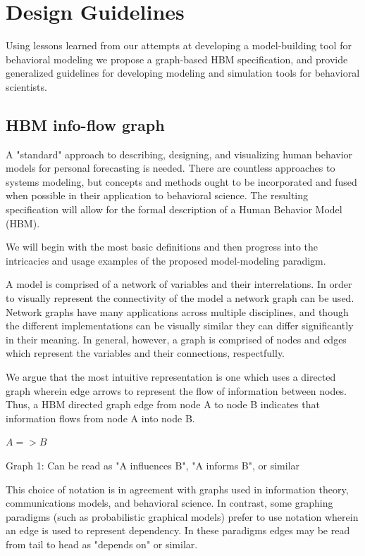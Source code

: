 \documentclass[conference]{IEEEtran}
\begin{document}
\section{Design Guidelines}
Using lessons learned from our attempts at developing a model-building tool for behavioral modeling we propose a graph-based HBM specification, and provide generalized guidelines for developing modeling and simulation tools for behavioral scientists.

\subsection{HBM info-flow graph}
A "standard" approach to describing, designing, and visualizing human behavior models for personal forecasting is needed.
There are countless approaches to systems modeling, but concepts and methods ought to be incorporated and fused when possible in their application to behavioral science.
The resulting specification will allow for the formal description of a Human Behavior Model (HBM).

We will begin with the most basic definitions and then progress into the intricacies and usage examples of the proposed model-modeling paradigm.

A model is comprised of a network of variables and their interrelations.
In order to visually represent the connectivity of the model a network graph can be used.
Network graphs have many applications across multiple disciplines, and though the different implementations can be visually similar they can differ significantly in their meaning.
In general, however, a graph is comprised of nodes and edges which represent the variables and their connections, respectfully. 

We argue that the most intuitive representation is one which uses a directed graph wherein edge arrows to represent the flow of information between nodes.
Thus, a HBM  directed graph edge from node A to node B indicates that information flows from node A into node B. 

$A => B$

Graph 1: Can be read as "A influences B", "A informs B", or similar

This choice of notation is in agreement with graphs used in information theory, communications models, and behavioral science.
In contrast, some graphing paradigms (such as probabilistic graphical models) prefer to use notation wherein an edge is used to represent dependency.
In these paradigms edges may be read from tail to head as "depends on" or similar.
\end{document}

